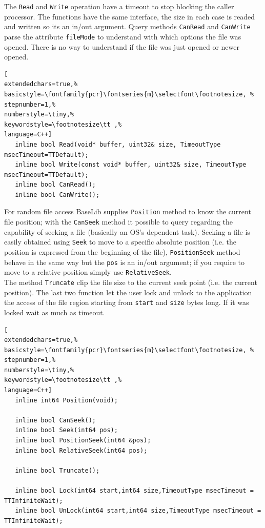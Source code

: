 The \texttt{Read} and \texttt{Write} operation have a timeout to stop blocking the caller processor. The functions have the same interface, the size in each case is readed and written so its an in/out argument. Query methods \texttt{CanRead} and \texttt{CanWrite} parse the attribute \texttt{fileMode} to understand with which options the file was opened. There is no way to understand if the file was just opened or newer opened.

\begin{lstlisting}[
extendedchars=true,%
basicstyle=\fontfamily{pcr}\fontseries{m}\selectfont\footnotesize, %
stepnumber=1,%
numberstyle=\tiny,%
keywordstyle=\footnotesize\tt ,%
language=C++]
   inline bool Read(void* buffer, uint32& size, TimeoutType msecTimeout=TTDefault);
   inline bool Write(const void* buffer, uint32& size, TimeoutType msecTimeout=TTDefault);
   inline bool CanRead();
   inline bool CanWrite();
\end{lstlisting}

For random file access BaseLib supplies \texttt{Position} method to know the current file position; with the \texttt{CanSeek} method it possible to query regarding the capability of seeking a file (basically an OS's dependent task). Seeking a file is easily obtained using \texttt{Seek} to move to a specific absolute position (i.e. the position is expressed from the beginning of the file), \texttt{PositionSeek} method behave in the same way but the \texttt{pos} is an in/out argument; if you require to move to a relative position simply use \texttt{RelativeSeek}.\\


The method \texttt{Truncate} clip the file size to the current seek point (i.e. the current position). The last two function let the user lock and unlock to the application the access of the file region starting from \texttt{start} and \texttt{size} bytes long. If it was locked wait as much as timeout.

\begin{lstlisting}[
extendedchars=true,%
basicstyle=\fontfamily{pcr}\fontseries{m}\selectfont\footnotesize, %
stepnumber=1,%
numberstyle=\tiny,%
keywordstyle=\footnotesize\tt ,%
language=C++]
   inline int64 Position(void);

   inline bool CanSeek();
   inline bool Seek(int64 pos);
   inline bool PositionSeek(int64 &pos);
   inline bool RelativeSeek(int64 pos);

   inline bool Truncate();

   inline bool Lock(int64 start,int64 size,TimeoutType msecTimeout = TTInfiniteWait);
   inline bool UnLock(int64 start,int64 size,TimeoutType msecTimeout = TTInfiniteWait);
\end{lstlisting}



